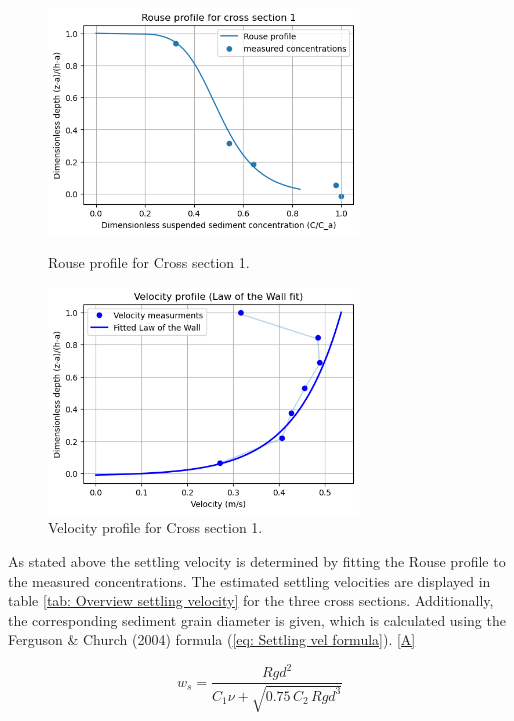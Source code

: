 \begin{figure}[H]
    \centering
    \begin{minipage}[b]{0.48\linewidth}
        \centering
        \includegraphics[height=6cm]{figures/ch6/RouseProfile_cs11.png}
        \caption{Rouse profile for Cross section 1.}
        \label{fig:RouseProfile_cs11}
    \end{minipage}
    \hfill
    \begin{minipage}[b]{0.48\linewidth}
        \centering
        \includegraphics[height=6cm]{figures/ch6/Vel_profile_cs11.png}
        \caption{Velocity profile for Cross section 1.}
        \label{fig:VelProfile_cs11}
    \end{minipage}
\end{figure}

As stated above the settling velocity is determined by fitting the Rouse profile to the measured concentrations. The estimated settling velocities are displayed in table \ref{tab: Overview settling velocity} for the three cross sections. Additionally, the corresponding sediment grain diameter is given, which is calculated using the Ferguson & Church (2004) formula (\ref{eq: Settling vel formula}). \ref{A}

\begin{equation}
    w_s = \frac{R g d^2}{C_1 \nu + \sqrt{0.75\, C_2\, R g d^3}}
    \label{eq: Settling vel formula}
\end{equation}



